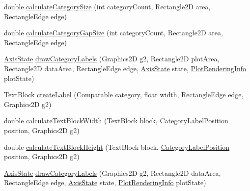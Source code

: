 \begin{DoxyCompactItemize}
\item 
double \mbox{\hyperlink{classorg_1_1jfree_1_1chart_1_1axis_1_1_category_axis_a6f001a2c5a7f9d22ab56a51ad86238f3}{calculate\+Category\+Size}} (int category\+Count, Rectangle2D area, Rectangle\+Edge edge)
\item 
double \mbox{\hyperlink{classorg_1_1jfree_1_1chart_1_1axis_1_1_category_axis_a3d29f9812a5354d4bf42c8f46643ca49}{calculate\+Category\+Gap\+Size}} (int category\+Count, Rectangle2D area, Rectangle\+Edge edge)
\item 
\mbox{\hyperlink{classorg_1_1jfree_1_1chart_1_1axis_1_1_axis_state}{Axis\+State}} \mbox{\hyperlink{classorg_1_1jfree_1_1chart_1_1axis_1_1_category_axis_a3cd4ab27665ce3107af4d090b1c0a0c5}{draw\+Category\+Labels}} (Graphics2D g2, Rectangle2D plot\+Area, Rectangle2D data\+Area, Rectangle\+Edge edge, \mbox{\hyperlink{classorg_1_1jfree_1_1chart_1_1axis_1_1_axis_state}{Axis\+State}} state, \mbox{\hyperlink{classorg_1_1jfree_1_1chart_1_1plot_1_1_plot_rendering_info}{Plot\+Rendering\+Info}} plot\+State)
\item 
Text\+Block \mbox{\hyperlink{classorg_1_1jfree_1_1chart_1_1axis_1_1_category_axis_a30d859ffdc934d9677b53634f8e42f3a}{create\+Label}} (Comparable category, float width, Rectangle\+Edge edge, Graphics2D g2)
\item 
double \mbox{\hyperlink{classorg_1_1jfree_1_1chart_1_1axis_1_1_category_axis_a371ae38b871028b8bf7a32fbaa71cf44}{calculate\+Text\+Block\+Width}} (Text\+Block block, \mbox{\hyperlink{classorg_1_1jfree_1_1chart_1_1axis_1_1_category_label_position}{Category\+Label\+Position}} position, Graphics2D g2)
\item 
double \mbox{\hyperlink{classorg_1_1jfree_1_1chart_1_1axis_1_1_category_axis_a3902a3393e241befb91baa5f312944c0}{calculate\+Text\+Block\+Height}} (Text\+Block block, \mbox{\hyperlink{classorg_1_1jfree_1_1chart_1_1axis_1_1_category_label_position}{Category\+Label\+Position}} position, Graphics2D g2)
\item 
\mbox{\hyperlink{classorg_1_1jfree_1_1chart_1_1axis_1_1_axis_state}{Axis\+State}} \mbox{\hyperlink{classorg_1_1jfree_1_1chart_1_1axis_1_1_category_axis_a33820b64df64e035d3363ff6556f3bdb}{draw\+Category\+Labels}} (Graphics2D g2, Rectangle2D data\+Area, Rectangle\+Edge edge, \mbox{\hyperlink{classorg_1_1jfree_1_1chart_1_1axis_1_1_axis_state}{Axis\+State}} state, \mbox{\hyperlink{classorg_1_1jfree_1_1chart_1_1plot_1_1_plot_rendering_info}{Plot\+Rendering\+Info}} plot\+State)
\end{DoxyCompactItemize}


